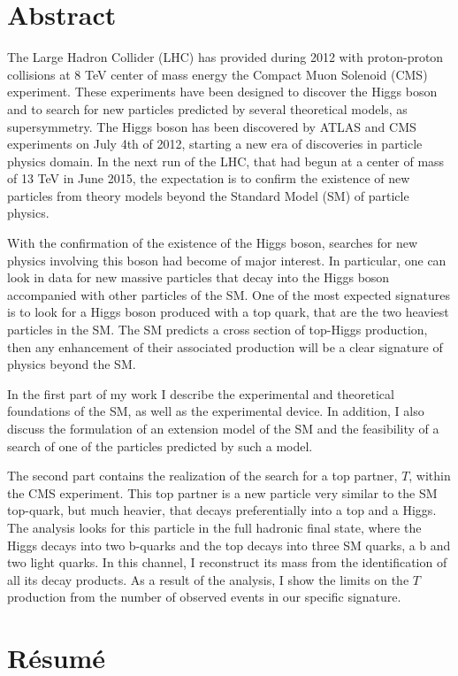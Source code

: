 \begingroup
\let\clearpage\relax
\let\cleardoublepage\relax
\let\cleardoublepage\relax

\chapter*{Abstract}

The Large Hadron Collider (LHC) has provided during 2012 with proton-proton collisions at 8 TeV center of mass energy the Compact Muon Solenoid (CMS) experiment. These experiments have been designed to discover the Higgs boson and to search for new particles predicted by several theoretical models, as supersymmetry. The Higgs boson has been discovered by ATLAS and CMS experiments on July 4th of 2012, starting a new era of discoveries in particle physics domain. In the next run of the LHC, that had begun at a center of mass of 13 TeV in June 2015, the expectation is to confirm the existence of new particles from theory models beyond the Standard Model (SM) of particle physics.

With the confirmation of the existence of the Higgs boson, searches for new physics involving this boson had become of major interest. In particular, one can look in data for new massive particles that decay into the Higgs boson accompanied with other particles of the SM. One of the most expected signatures is to look for a Higgs boson produced with a top quark, that are the two heaviest particles in the SM. The SM predicts a cross section of top-Higgs production, then any enhancement of their associated production will be a clear signature of physics beyond the SM.

In the first part of my work I describe the experimental and theoretical foundations of the SM, as well as the experimental device. In addition, I also discuss the formulation of an extension model of the SM and the feasibility of a search of one of the particles predicted by such a model.

The second part contains the realization of the search for a top partner, $T$, within the CMS experiment. This top partner is a new particle very similar to the SM top-quark, but much heavier, that decays preferentially into a top and a Higgs. The analysis looks for this particle in the full hadronic final state, where the Higgs decays into two b-quarks and the top decays into three SM quarks, a b and two light quarks. In this channel, I reconstruct its mass from the identification of all its decay products. As a result of the analysis, I show the limits on the $T$ production from the number of observed events in our specific signature. 

\chapter*{R\'{e}sum\'{e}}



\endgroup
